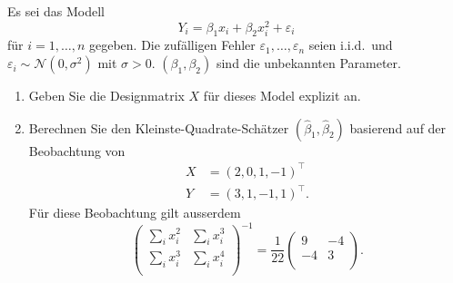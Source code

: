 




 Es sei das Modell 
\begin{equation*}
    Y_i = \beta_1 x_i + \beta_2 x_{i}^2 + \varepsilon_i
\end{equation*}
für $i=1,\ldots,n$ gegeben. Die zufälligen Fehler $\varepsilon_1,\ldots,\varepsilon_n$ 
seien i.i.d.\ und $\varepsilon_i\sim \mathcal N(0,\sigma^2)$ mit $\sigma>0$. 
$\left(\beta_1, \beta_2 \right)$ sind die unbekannten Parameter. 
\begin{enumerate}
    \item Geben Sie die Designmatrix $X$ für dieses Model explizit an.
    \item Berechnen Sie den Kleinste-Quadrate-Schätzer $\left( \hat\beta_1,
        \hat\beta_2 \right)$ basierend auf der Beobachtung von
        \begin{align*}
            X &= \left( 2,0,1,-1 \right)^\top \\
            Y &= \left( 3,1,-1,1 \right)^\top.
        \end{align*}
        Für diese Beobachtung gilt ausserdem
        \begin{equation*}
            \left( 
                \begin{matrix}
                    \sum_{i}^{}x_i^2 & \sum_{i}^{} x_i^{3} \\
                    \sum_{i}^{} x_i^3 & \sum_{i}^{} x_i^4 \\
                \end{matrix}
            \right)^{-1} = 
            \frac{1}{22} \left( 
            \begin{matrix}
                9 & -4 \\
                -4 & 3 \\
            \end{matrix}
            \right).
        \end{equation*}
\end{enumerate}

